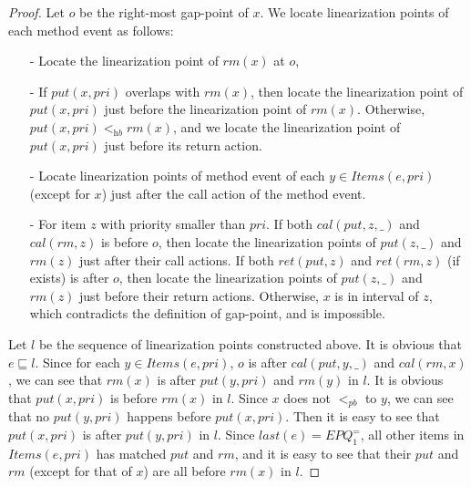 \begin {proof}

Let $o$ be the right-most gap-point of $x$. We locate linearization points of each method event as follows:

\begin{itemize}
\setlength{\itemsep}{0.5pt}
\item[-] Locate the linearization point of $\textit{rm}(x)$ at $o$,

\item[-] If $\textit{put}(x,\textit{pri})$ overlaps with $\textit{rm}(x)$, then locate the linearization point of $\textit{put}(x,\textit{pri})$ just before the linearization point of $\textit{rm}(x)$. Otherwise, $\textit{put}(x,\textit{pri}) <_{\textit{hb}} \textit{rm}(x)$, and we locate the linearization point of $\textit{put}(x,\textit{pri})$ just before its return action.

\item[-] Locate linearization points of method event of each $y \in \textit{Items}(e,\textit{pri})$ (except for $x$) just after the call action of the method event.

\item[-] For item $z$ with priority smaller than $\textit{pri}$. If both $\textit{cal}(\textit{put},z,\_)$ and $\textit{cal}(\textit{rm},z)$ is before $o$, then locate the linearization points of $\textit{put}(z,\_)$ and $\textit{rm}(z)$ just after their call actions. If both $\textit{ret}(\textit{put},z)$ and $\textit{ret}(\textit{rm},z)$ (if exists) is after $o$, then locate the linearization points of $\textit{put}(z,\_)$ and $\textit{rm}(z)$ just before their return actions. Otherwise, $x$ is in interval of $z$, which contradicts the definition of gap-point, and is impossible.
\end{itemize}

Let $l$ be the sequence of linearization points constructed above. It is obvious that $e \sqsubseteq l$. Since for each $y \in \textit{Items}(e,\textit{pri})$, $o$ is after $\textit{cal}(\textit{put},y,\_)$ and $\textit{cal}(\textit{rm},x)$, we can see that $\textit{rm}(x)$ is after $\textit{put}(y,\textit{pri})$ and $\textit{rm}(y)$ in $l$. It is obvious that $\textit{put}(x,\textit{pri})$ is before $\textit{rm}(x)$ in $l$. Since $x$ does not $<_{\textit{pb}}$ to $y$, we can see that no $\textit{put}(y,\textit{pri})$ happens before $\textit{put}(x,\textit{pri})$. Then it is easy to see that $\textit{put}(x,\textit{pri})$ is after $\textit{put}(y,\textit{pri})$ in $l$. Since $\textit{last}(e) = \textit{EPQ}_1^{=}$, all other items in $\textit{Items}(e,\textit{pri})$ has matched $\textit{put}$ and $\textit{rm}$, and it is easy to see that their $\textit{put}$ and $\textit{rm}$ (except for that of $x$) are all before $\textit{rm}(x)$ in $l$.


\end{proof}
